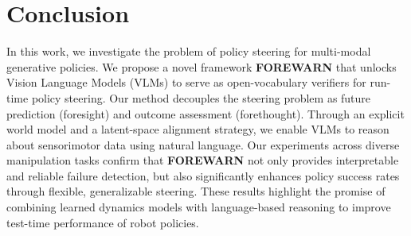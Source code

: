 \section{Conclusion}
In this work, we investigate the problem of policy steering for multi-modal generative policies. We propose a novel framework \textbf{FOREWARN} that unlocks Vision Language Models (VLMs) to serve as open-vocabulary verifiers for run-time policy steering. 
Our method decouples the steering problem as future prediction (foresight) and outcome assessment (forethought). Through an explicit world model and a latent-space alignment strategy, we enable VLMs to reason about sensorimotor data using natural language. Our experiments across diverse manipulation tasks confirm that \textbf{FOREWARN} not only provides interpretable and reliable failure detection, but also significantly enhances policy success rates through flexible, generalizable steering. These results highlight the promise of combining learned dynamics models with language-based reasoning to improve test-time performance of robot policies.

